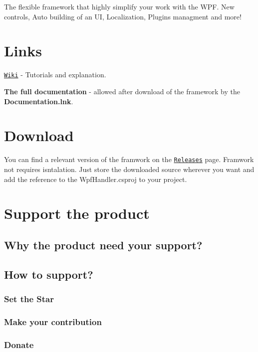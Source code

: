 The flexible framework that highly simplify your work with the W\+PF. New controls, Auto building of an UI, Localization, Plugins managment and more!

\section*{Links}


\begin{DoxyItemize}
\item \href{https://github.com/ElbyFross/wpf-handler/wiki}{\tt Wiki} -\/ Tutorials and explanation.
\item {\bfseries The full documentation} -\/ allowed after download of the framework by the {\bfseries Documentation.\+lnk}.
\end{DoxyItemize}

\section*{Download}

You can find a relevant version of the framwork on the \href{https://github.com/ElbyFross/wpf-handler/releases}{\tt Releases} page. Framwork not requires isntalation. Just store the downloaded source wherever you want and add the reference to the {\ttfamily Wpf\+Handler.\+csproj} to your project.

\section*{Support the product}

\subsection*{Why the product need your support?}

\subsection*{How to support?}

\subsubsection*{Set the Star}

\subsubsection*{Make your contribution}

\subsubsection*{Donate}